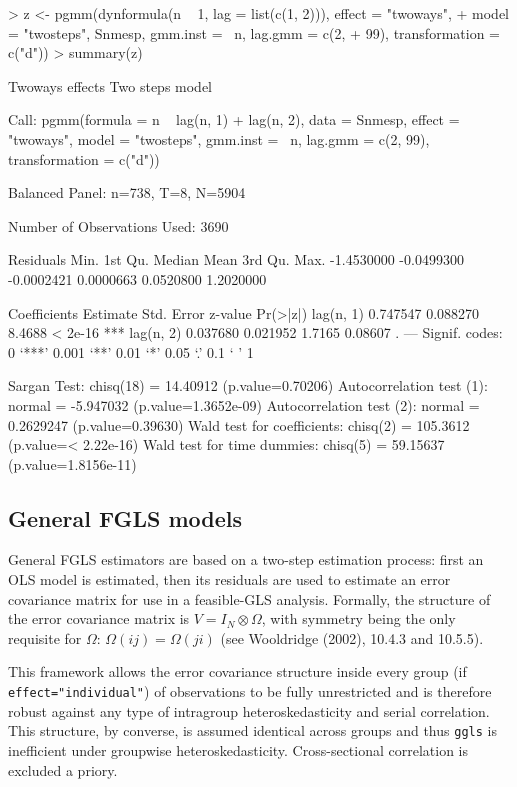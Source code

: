 \documentclass[a4paper]{article}
\begin{document}
\begin{Schunk}
\begin{Sinput}
> z <- pgmm(dynformula(n ~ 1, lag = list(c(1, 2))), effect = "twoways", 
+     model = "twosteps", Snmesp, gmm.inst = ~n, lag.gmm = c(2, 
+         99), transformation = c("d"))
> summary(z)
\end{Sinput}
\begin{Soutput}
Twoways effects Two steps model

Call:
pgmm(formula = n ~ lag(n, 1) + lag(n, 2), data = Snmesp, effect = "twoways", 
    model = "twosteps", gmm.inst = ~n, lag.gmm = c(2, 99), transformation = c("d"))

Balanced Panel: n=738, T=8, N=5904

Number of Observations Used:  3690 

Residuals
      Min.    1st Qu.     Median       Mean    3rd Qu.       Max. 
-1.4530000 -0.0499300 -0.0002421  0.0000663  0.0520800  1.2020000 

Coefficients
          Estimate Std. Error z-value Pr(>|z|)    
lag(n, 1) 0.747547   0.088270  8.4688  < 2e-16 ***
lag(n, 2) 0.037680   0.021952  1.7165  0.08607 .  
---
Signif. codes:  0 ‘***’ 0.001 ‘**’ 0.01 ‘*’ 0.05 ‘.’ 0.1 ‘ ’ 1 

Sargan Test: chisq(18) = 14.40912 (p.value=0.70206)
Autocorrelation test (1): normal = -5.947032 (p.value=1.3652e-09)
Autocorrelation test (2): normal = 0.2629247 (p.value=0.39630)
Wald test for coefficients: chisq(2) = 105.3612 (p.value=< 2.22e-16)
Wald test for time dummies: chisq(5) = 59.15637 (p.value=1.8156e-11)
\end{Soutput}
\end{Schunk}

\subsection{General FGLS models}
General FGLS estimators are based on a two-step estimation process: first an OLS model is estimated, then its residuals are used to estimate an error covariance matrix for use in a feasible-GLS analysis. Formally, the structure of the error covariance matrix is $ V=I_N \otimes \Omega $, with symmetry being the only requisite for $\Omega$: $ \Omega(ij)=\Omega(ji) $ (see Wooldridge (2002), 10.4.3 and 10.5.5).

This framework allows the error covariance structure inside every group (if \texttt{effect="individual"}) of observations to be fully unrestricted and is therefore robust against any type of intragroup heteroskedasticity and serial correlation. This structure, by converse, is assumed identical across groups and thus \texttt{ggls} is inefficient under groupwise heteroskedasticity. Cross-sectional correlation is excluded a priory.
\end{document}

